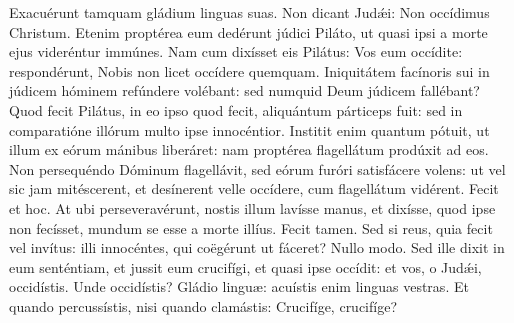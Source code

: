 
\lesson


Exacuérunt tamquam gládium linguas suas. Non dicant Judǽi: Non occídimus
Christum. Etenim proptérea eum dedérunt júdici Piláto, ut quasi ipsi a
morte ejus videréntur immúnes. Nam cum dixísset eis Pilátus: Vos eum
occídite: respondérunt, Nobis non licet occídere quemquam. Iniquitátem
facínoris sui in júdicem hóminem refúndere volébant: sed numquid Deum
júdicem fallébant? Quod fecit Pilátus, in eo ipso quod fecit, aliquántum
párticeps fuit: sed in comparatióne illórum multo ipse innocéntior.
Institit enim quantum pótuit, ut illum ex eórum mánibus liberáret: nam
proptérea flagellátum prodúxit ad eos. Non persequéndo Dóminum flagellávit,
sed eórum furóri satisfácere volens: ut vel sic jam mitéscerent, et
desínerent velle occídere, cum flagellátum vidérent. Fecit et hoc. At ubi
perseveravérunt, nostis illum lavísse manus, et dixísse, quod ipse non
fecísset, mundum se esse a morte illíus. Fecit tamen. Sed si reus, quia
fecit vel invítus: illi innocéntes, qui coëgérunt ut fáceret? Nullo modo.
Sed ille dixit in eum senténtiam, et jussit eum crucifígi, et quasi ipse
occídit: et vos, o Judǽi, occidístis. Unde occidístis? Gládio linguæ:
acuístis enim linguas vestras. Et quando percussístis, nisi quando
clamástis: Crucifíge, crucifíge?

